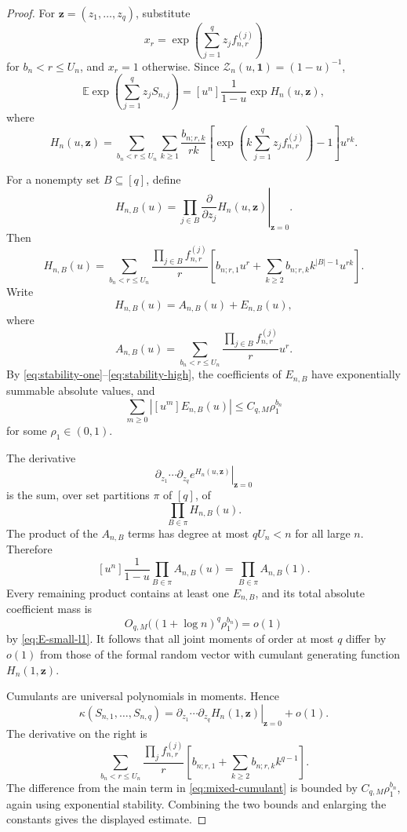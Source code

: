 \documentclass[11pt]{article}
\theoremstyle{definition}
\theoremstyle{remark}
\newcommand{\Ee}{\mathbb E}
\newcommand{\cZ}{\mathcal Z}
\begin{document}
\begin{proof}
For $\mathbf z=(z_1,\ldots,z_q)$, substitute
\[
 x_r=\exp\left(\sum_{j=1}^qz_jf_{n,r}^{(j)}\right)
\]
for $b_n<r\le U_n$, and $x_r=1$ otherwise.  Since
$\cZ_n(u,\mathbf1)=(1-u)^{-1}$,
\[
 \Ee\exp\left(\sum_{j=1}^qz_jS_{n,j}\right)
 =
 [u^n]\frac1{1-u}\exp H_n(u,\mathbf z),
\]
where
\[
 H_n(u,\mathbf z)
 =
 \sum_{b_n<r\le U_n}\sum_{k\ge1}
 \frac{b_{n;r,k}}{rk}
 \left[
 \exp\left(k\sum_{j=1}^qz_jf_{n,r}^{(j)}\right)-1
 \right]u^{rk}.
\]

For a nonempty set $B\subseteq[q]$, define
\[
 H_{n,B}(u)
 =
 \left.
 \prod_{j\in B}\frac{\partial}{\partial z_j}
 H_n(u,\mathbf z)
 \right|_{\mathbf z=0}.
\]
Then
\[
 H_{n,B}(u)
 =
 \sum_{b_n<r\le U_n}
 \frac{\prod_{j\in B}f_{n,r}^{(j)}}r
 \left[
 b_{n;r,1}u^r+
 \sum_{k\ge2}b_{n;r,k}k^{|B|-1}u^{rk}
 \right].
\]
Write
\[
 H_{n,B}(u)=A_{n,B}(u)+E_{n,B}(u),
\]
where
\[
 A_{n,B}(u)
 =
 \sum_{b_n<r\le U_n}
 \frac{\prod_{j\in B}f_{n,r}^{(j)}}r u^r.
\]
By \eqref{eq:stability-one}--\eqref{eq:stability-high}, the coefficients
of $E_{n,B}$ have exponentially summable absolute values, and
\begin{equation}\label{eq:E-small-l1}
 \sum_{m\ge0}|[u^m]E_{n,B}(u)|
 \le C_{q,M}\rho_1^{b_n}
\end{equation}
for some $\rho_1\in(0,1)$.

The derivative
\[
 \left.
 \partial_{z_1}\cdots\partial_{z_q}
 e^{H_n(u,\mathbf z)}
 \right|_{\mathbf z=0}
\]
is the sum, over set partitions $\pi$ of $[q]$, of
\[
 \prod_{B\in\pi}H_{n,B}(u).
\]
The product of the $A_{n,B}$ terms has degree at most $qU_n<n$ for all
large $n$.  Therefore
\[
 [u^n]\frac1{1-u}\prod_{B\in\pi}A_{n,B}(u)
 =
 \prod_{B\in\pi}A_{n,B}(1).
\]
Every remaining product contains at least one $E_{n,B}$, and its total
absolute coefficient mass is
\[
 O_{q,M}\bigl((1+\log n)^q\rho_1^{b_n}\bigr)=o(1)
\]
by \eqref{eq:E-small-l1}.  It follows that all joint moments of order at
most $q$ differ by $o(1)$ from those of the formal random vector with
cumulant generating function $H_n(1,\mathbf z)$.

Cumulants are universal polynomials in moments.  Hence
\[
 \kappa(S_{n,1},\ldots,S_{n,q})
 =
 \left.
 \partial_{z_1}\cdots\partial_{z_q}
 H_n(1,\mathbf z)
 \right|_{\mathbf z=0}
 +o(1).
\]
The derivative on the right is
\[
 \sum_{b_n<r\le U_n}
 \frac{\prod_jf_{n,r}^{(j)}}r
 \left[
 b_{n;r,1}
 +\sum_{k\ge2}b_{n;r,k}k^{q-1}
 \right].
\]
The difference from the main term in \eqref{eq:mixed-cumulant} is bounded
by $C_{q,M}\rho_1^{b_n}$, again using exponential stability.  Combining
the two bounds and enlarging the constants gives the displayed estimate.
\end{proof}
\end{document}

